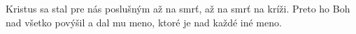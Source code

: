 Kristus sa stal pre nás poslušným až na smrť,
až na smrť na kríži. 
\versseparator
Preto ho Boh nad všetko povýšil
a dal mu meno, ktoré je nad každé iné meno.